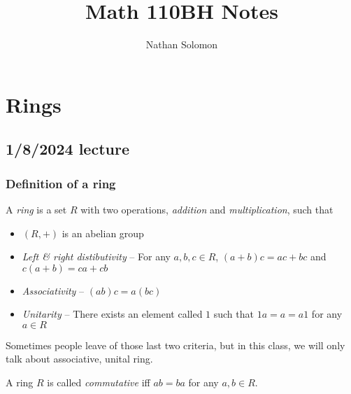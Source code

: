 \documentclass[12pt]{article}
\begin{document}
\title{Math 110BH Notes}
\author{Nathan Solomon}
\maketitle

\tableofcontents

\section{Rings}
\subsection{1/8/2024 lecture}
\subsubsection{Definition of a ring}
A \textit{ring} is a set $R$ with two operations, \textit{addition} and \textit{multiplication}, such that
\begin{itemize}
    \item $(R,+)$ is an abelian group
    \item \textit{Left \& right distibutivity} -- For any $a,b,c \in R$, $(a+b)c = ac+bc$ and $c(a+b)=ca+cb$
    \item \textit{Associativity} -- $(ab)c=a(bc)$
    \item \textit{Unitarity} -- There exists an element called $1$ such that $1a=a=a1$ for any $a\in R$
\end{itemize}
Sometimes people leave of those last two criteria, but in this class, we will only talk about associative, unital ring.
\par
A ring $R$ is called \textit{commutative} iff $ab=ba$ for any $a,b \in R$.
\par
\end{document}
